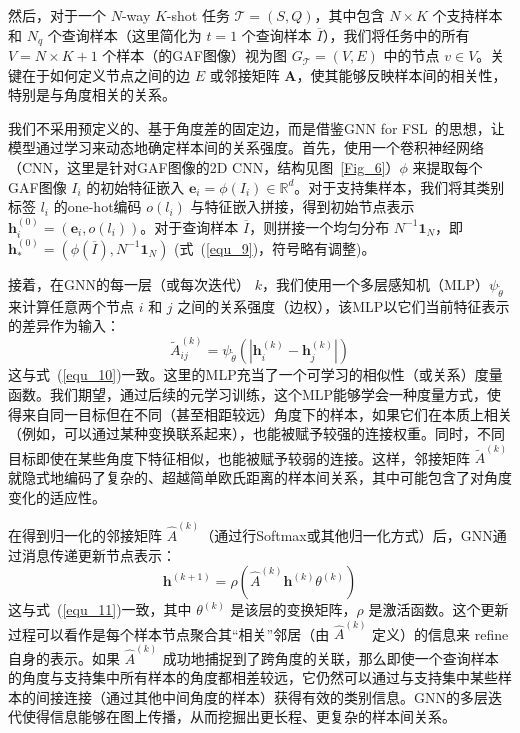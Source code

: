 然后，对于一个 $N$-way $K$-shot 任务 $\mathcal{T} = (S, Q)$，其中包含 $N \times K$ 个支持样本和 $N_q$ 个查询样本（这里简化为 $t=1$ 个查询样本 $\overline{I}$），我们将任务中的所有 $V = N \times K + 1$ 个样本（的GAF图像）视为图 $G_{\mathcal{T}} = (V, E)$ 中的节点 $v \in V$。关键在于如何定义节点之间的边 $E$ 或邻接矩阵 $\mathbf{A}$，使其能够反映样本间的相关性，特别是与角度相关的关系。

我们不采用预定义的、基于角度差的固定边，而是借鉴GNN for FSL~\cite{ref42}的思想，让模型通过学习来动态地确定样本间的关系强度。首先，使用一个卷积神经网络（CNN，这里是针对GAF图像的2D CNN，结构见图~\ref{Fig_6}）$\phi$ 来提取每个GAF图像 $I_i$ 的初始特征嵌入 $\mathbf{e}_i = \phi(I_i) \in \mathbb{R}^d$。对于支持集样本，我们将其类别标签 $l_i$ 的one-hot编码 $o(l_i)$ 与特征嵌入拼接，得到初始节点表示 $\mathbf{h}_i^{(0)} = (\mathbf{e}_i, o(l_i))$。对于查询样本 $\overline{I}$，则拼接一个均匀分布 $N^{-1}\mathbf{1}_N$，即 $\mathbf{h}_*^{(0)} = (\phi(\overline{I}), N^{-1}\mathbf{1}_N)$ (式~(\ref{equ_9})，符号略有调整)。

接着，在GNN的每一层（或每次迭代） $k$，我们使用一个多层感知机（MLP）$\psi_{\tilde{\theta}}$ 来计算任意两个节点 $i$ 和 $j$ 之间的关系强度（边权），该MLP以它们当前特征表示的差异作为输入：
\begin{equation}
    \tilde{A}_{ij}^{(k)} = \psi_{\tilde{\theta}}(|\mathbf{h}_i^{(k)} - \mathbf{h}_j^{(k)}|)
    \label{eq:edge_weight_mlp}
\end{equation}
这与式~(\ref{equ_10})一致。这里的MLP充当了一个可学习的相似性（或关系）度量函数。我们期望，通过后续的元学习训练，这个MLP能够学会一种度量方式，使得来自同一目标但在不同（甚至相距较远）角度下的样本，如果它们在本质上相关（例如，可以通过某种变换联系起来），也能被赋予较强的连接权重。同时，不同目标即使在某些角度下特征相似，也能被赋予较弱的连接。这样，邻接矩阵 $\tilde{A}^{(k)}$ 就隐式地编码了复杂的、超越简单欧氏距离的样本间关系，其中可能包含了对角度变化的适应性。

在得到归一化的邻接矩阵 $\hat{A}^{(k)}$（通过行Softmax或其他归一化方式）后，GNN通过消息传递更新节点表示：
\begin{equation}
    \mathbf{h}^{(k+1)} = \rho(\hat{A}^{(k)} \mathbf{h}^{(k)} \theta^{(k)})
    \label{eq:gnn_update_angle}
\end{equation}
这与式~(\ref{equ_11})一致，其中 $\theta^{(k)}$ 是该层的变换矩阵，$\rho$ 是激活函数。这个更新过程可以看作是每个样本节点聚合其“相关”邻居（由 $\hat{A}^{(k)}$ 定义）的信息来 refine 自身的表示。如果 $\hat{A}^{(k)}$ 成功地捕捉到了跨角度的关联，那么即使一个查询样本的角度与支持集中所有样本的角度都相差较远，它仍然可以通过与支持集中某些样本的间接连接（通过其他中间角度的样本）获得有效的类别信息。GNN的多层迭代使得信息能够在图上传播，从而挖掘出更长程、更复杂的样本间关系。

